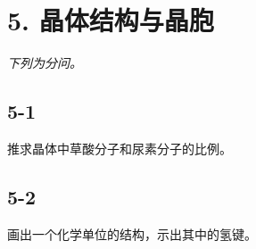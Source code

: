 \section*{5. 晶体结构与晶胞}
\textit{下列为分问。}

\subsection*{5-1}
推求晶体中草酸分⼦和尿素分⼦的⽐例。

\subsection*{5-2}
画出⼀个化学单位的结构，⽰出其中的氢键。
